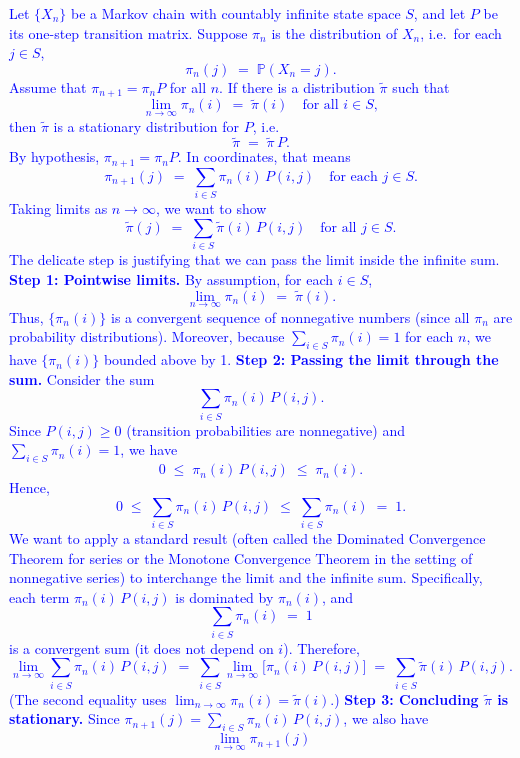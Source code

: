 \documentclass{article}
\begin{document}
\textcolor{blue}{
Let \(\{X_n\}\) be a Markov chain with countably infinite state space \(S\),
and let \(P\) be its one-step transition matrix.  Suppose \(\pi_n\) is the
distribution of \(X_n\), i.e.\ for each \(j \in S\),
\[
  \pi_n(j) \;=\; \mathbb{P}(X_n = j).
\]
Assume that \(\pi_{n+1} = \pi_n P\) for all \(n\).  
If there is a distribution \(\tilde{\pi}\) such that
\[
  \lim_{n \to \infty} \pi_n(i) \;=\; \tilde{\pi}(i)
  \quad \text{for all } i \in S,
\]
then \(\tilde{\pi}\) is a stationary distribution for \(P\), i.e.\
\[
  \tilde{\pi} \;=\; \tilde{\pi}\,P.
\]
By hypothesis, \(\pi_{n+1} = \pi_n P\).  In coordinates, that means
\[
  \pi_{n+1}(j) \;=\; \sum_{i \in S} \pi_n(i)\,P(i,j)
  \quad \text{for each } j \in S.
\]
Taking limits as \(n \to \infty\), we want to show
\[
  \tilde{\pi}(j)
  \;=\;
  \sum_{i \in S} \tilde{\pi}(i)\,P(i,j)
  \quad \text{for all } j \in S.
\]
The delicate step is justifying that we can pass the limit inside the infinite sum.
\medskip
\noindent
\textbf{Step 1: Pointwise limits.}
By assumption, for each \(i \in S\),
\[
  \lim_{n \to \infty} \pi_n(i) \;=\; \tilde{\pi}(i).
\]
Thus, \(\{\pi_n(i)\}\) is a convergent sequence of nonnegative numbers (since
all \(\pi_n\) are probability distributions).  Moreover, because
\(\sum_{i \in S} \pi_n(i) = 1\) for each \(n\), we have \(\{\pi_n(i)\}\)
bounded above by 1.
\medskip
\noindent
\textbf{Step 2: Passing the limit through the sum.}
Consider the sum
\[
  \sum_{i \in S} \pi_n(i)\,P(i,j).
\]
Since \(P(i,j)\ge 0\) (transition probabilities are nonnegative) and
\(\sum_{i \in S} \pi_n(i)=1\), we have
\[
  0 \;\le\; \pi_n(i)\,P(i,j) \;\le\; \pi_n(i).
\]
Hence,
\[
  0 \;\le\; \sum_{i \in S} \pi_n(i)\,P(i,j)
     \;\le\; \sum_{i \in S} \pi_n(i)
     \;=\; 1.
\]
We want to apply a standard result (often called the Dominated Convergence Theorem for series or the Monotone Convergence Theorem in the setting of nonnegative series) to interchange the limit and the infinite sum.  Specifically, each term \(\pi_n(i)\,P(i,j)\) is dominated by \(\pi_n(i)\), and
\[
   \sum_{i\in S} \pi_n(i)
   \;=\; 1
\]
is a convergent sum (it does not depend on \(i\)).  Therefore,
\[
  \lim_{n \to \infty} \sum_{i \in S} \pi_n(i)\,P(i,j)
  \;=\;
  \sum_{i \in S} \lim_{n \to \infty} \bigl[\pi_n(i)\,P(i,j)\bigr]
  \;=\;
  \sum_{i \in S} \tilde{\pi}(i)\,P(i,j).
\]
(The second equality uses \(\lim_{n\to\infty}\pi_n(i) = \tilde{\pi}(i)\).)
\medskip
\noindent
\textbf{Step 3: Concluding \(\tilde{\pi}\) is stationary.}
Since \(\pi_{n+1}(j) = \sum_{i \in S} \pi_n(i)\,P(i,j)\), we also have
\[
  \lim_{n \to \infty} \pi_{n+1}(j)
\]}
\end{document}
